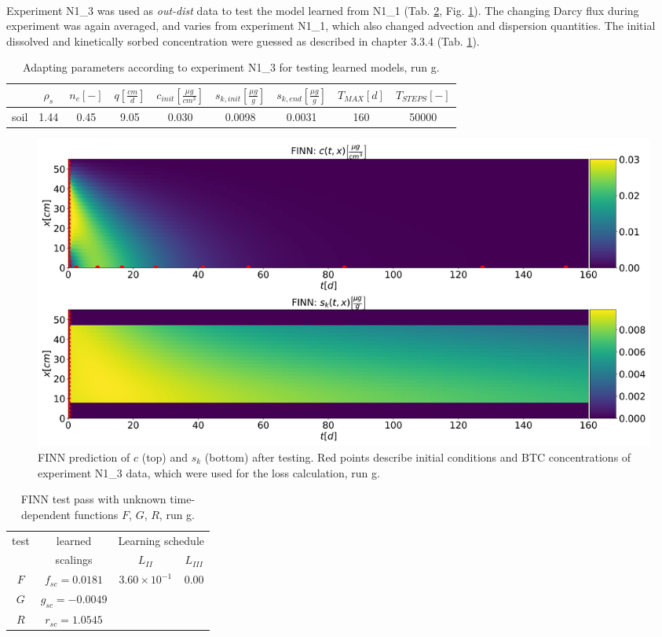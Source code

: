 \\
Experiment N1\_3 was used as \textit{out-dist} data to test the model learned from N1\_1 (Tab. \ref{tab:FGR_exp_learn}, Fig. \ref{fig:res_ov_exp_FGR_test}). The changing Darcy flux during experiment was again averaged, and varies from experiment N1\_1, which also changed advection and dispersion quantities. The initial dissolved and kinetically sorbed concentration were guessed as described in chapter 3.3.4 (Tab. \ref{tab:test_run_g}).
\begin{table}[h!]
    \centering
    \begin{tabular}{c|cccccccc}
      &$\rho_s$ & $n_{e} [-]$ &$q \left[\frac{cm}{d}\right]$ & $c_{init} \left[\frac{\mu g}{cm^3}\right] $& $s_{k,init} \left[\frac{\mu g}{g}\right]$ & $s_{k, end} \left[\frac{\mu g}{g}\right]$ & $T_{MAX} \left[d\right]$ & $T_{STEPS} \left[-\right]$ \\ [0.2 cm] \hline
      soil & 1.44 & 0.45 & 9.05 & 0.030 & 0.0098 & 0.0031 & 160 & 50000
    \end{tabular}
    \caption[Adapting parameters according to experiment N1\_3 for testing, run g]{Adapting parameters according to experiment N1\_3 for testing learned models, run g.}
    \label{tab:test_run_g}
\end{table}
\begin{figure}[h!]
	\centering
	\includegraphics[width=\textwidth]{images/res_ov_exp_FGR_test.png}
\caption[FINN predicted solution after testing, run g]{FINN prediction of $c$ (top) and $s_k$ (bottom) after testing. Red points describe initial conditions and BTC concentrations of experiment N1\_3 data, which were used for the loss calculation, run g.}
\label{fig:res_ov_exp_FGR_test}
\end{figure}
\begin{table}[h!]
    \centering
    \begin{tabular}{c|c||cc}
    test & learned & \multicolumn{2}{c}{Learning schedule}\\
    \quad & scalings & $L_{II}$ & $L_{III}$ \\[0.2 cm] \hline
          $F$ & $f_{sc} = 0.0181$ & $3.60 \times 10^{-1}$ & $ 0.00 $\\
          $G$ & $g_{sc} = -0.0049$ & & \\
          $R$ & $r_{sc} = 1.0545$ & & 
        \end{tabular}
    \caption[FINN testing with unknown time-dependent functions $F$, $G$, $R$, run g]{FINN test pass with unknown time-dependent functions $F$, $G$, $R$, run g.}
    \label{tab:FGR_exp_learn}
\end{table}\\
